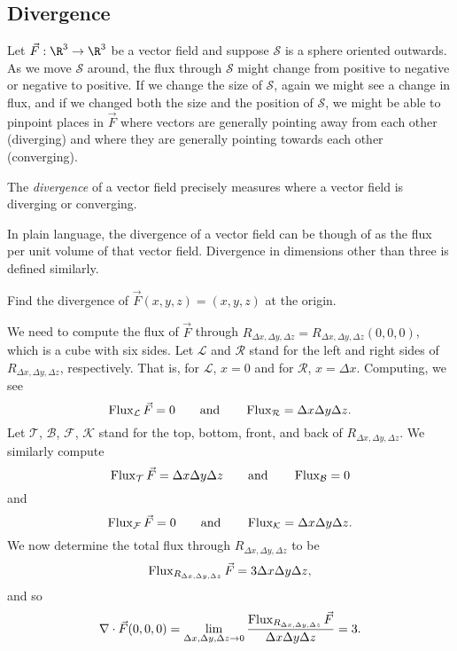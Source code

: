 \subsection{Divergence}

Let $\vec F:\R^3\to\R^3$ be a vector field and suppose $\mathcal S$ is a 
sphere oriented outwards.  As we move $\mathcal S$ around,
the flux through $\mathcal S$ might change from positive to negative or negative to positive.
If we change the size of $\mathcal S$, again we might see a change in flux, and if
we changed both the size and the position of $\mathcal S$, we might be able to pinpoint
places in $\vec F$ where vectors are generally pointing away from each other (diverging)
and where they are generally pointing towards each other (converging).


The \emph{divergence} of a vector field precisely measures
where a vector field is diverging or converging.  

\DefDivergence

In plain language, the divergence of a vector field can be though of as the flux per unit volume
of that vector field.  Divergence in dimensions other than three is defined similarly.

\begin{example}
	Find the divergence of $\vec F(x,y,z)=(x,y,z)$ at the origin.

	We need to compute the flux of $\vec F$ through $R_{\Delta x,\Delta y,\Delta z} = R_{\Delta x,\Delta y,\Delta z}(0,0,0)$,
	which is a cube with six sides.  Let $\mathcal L$ and $\mathcal R$ stand for the left and
	right sides of $R_{\Delta x,\Delta y, \Delta z}$, respectively.
	That is, for $\mathcal L$, $x=0$ and for $\mathcal R$, $x=\Delta x$.  Computing, we see
	\[
		\operatorname{Flux}_{\mathcal L}\vec F = 0\qquad\text{and}
		\qquad \operatorname{Flux}_{\mathcal R} = \Delta x\Delta y\Delta z.
	\]
	Let $\mathcal T$, $\mathcal B$, $\mathcal F$, $\mathcal K$ stand for the top, bottom, front,
	and back of $R_{\Delta x,\Delta y,\Delta z}$.  We similarly compute
	\[
		\operatorname{Flux}_{\mathcal T}\vec F = \Delta x\Delta y\Delta z\qquad\text{and}
		\qquad \operatorname{Flux}_{\mathcal B} = 0
	\]
	and
	\[
		\operatorname{Flux}_{\mathcal F}\vec F = 0\qquad\text{and}
		\qquad \operatorname{Flux}_{\mathcal K} = \Delta x\Delta y\Delta z.
	\]
	We now determine the total flux through $R_{\Delta x,\Delta y, \Delta z}$ to be
	\[
		\operatorname{Flux}_{R_{\Delta x,\Delta y, \Delta z}}\vec F = 3\Delta x\Delta y\Delta z,
	\]
	and so
	\[
		\nabla \cdot \vec F(0,0,0) = \lim_{\Delta x,\Delta y,\Delta z\to 0}\frac{\operatorname{Flux}_{R_{\Delta x,\Delta y, \Delta z}}\vec F}{\Delta x\Delta y\Delta z} = 3.
	\]
\end{example}

